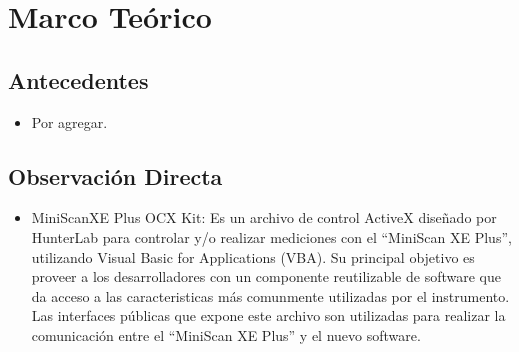 \chapter{\label{cap:2}Marco Te\'{o}rico}

	\section{Antecedentes}	
		\begin{itemize}
			\item Por agregar.
		\end{itemize}

	\section{Observaci\'{o}n Directa}
		\begin{itemize}
			\item MiniScanXE Plus OCX Kit: Es un archivo de control ActiveX dise\~{n}ado por HunterLab para controlar y/o realizar mediciones con el ``MiniScan XE Plus'', utilizando Visual Basic for Applications (VBA). Su principal objetivo es proveer a los desarrolladores con un componente reutilizable de software que da acceso a las caracteristicas m\'{a}s comunmente utilizadas por el instrumento. Las interfaces p\'{u}blicas que expone este archivo son utilizadas para realizar la comunicaci\'{o}n entre el ``MiniScan XE Plus'' y el nuevo software.
		\end{itemize}